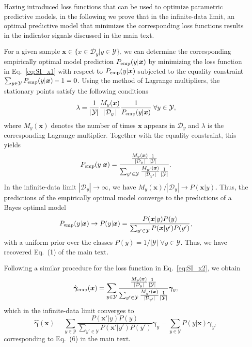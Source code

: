Having introduced loss functions that can be used to optimize parametric predictive models, in the following we prove that in the infinite-data limit, an optimal predictive model that minimizes the corresponding loss functions results in the indicator signals discussed in the main text.

\indent For a given sample $\bm{x} \in \{x \in \mathcal{D}_{y}|y \in \mathcal{Y} \}$, we can determine the corresponding empirically optimal model prediction $P_{\rm emp}(y|\bm{x})$ by minimizing the loss function in Eq.~\eqref{eq:SI_x1} with respect to $P_{\rm emp}(y|\bm{x})$ subjected to the equality constraint $\sum_{y\in\mathcal{Y}} P_{\rm emp}(y|\bm{x}) - 1 = 0$. Using the method of Lagrange multipliers, the stationary points satisfy the following conditions
\begin{equation}
    \lambda = \frac{1}{|\mathcal{Y}|} \frac{M_{y}(\bm{x})}{|\mathcal{D}_{y}|} \frac{1}{P_{\rm emp}(y|\bm{x})}\; \forall y \in \mathcal{Y},
\end{equation}
where $M_{y}(\bm{x})$ denotes the number of times $\bm{x}$ appears in $\mathcal{D}_{y}$ and $\lambda$ is the corresponding Lagrange multiplier. Together with the equality constraint, this yields
\begin{equation}
    P_{\rm emp}(y|\bm{x}) = \frac{\frac{M_{y}(\bm{x})}{|\mathcal{D}_{y}|} \frac{1}{|\mathcal{Y}|}}{\sum_{y' \in \mathcal{Y}} \frac{M_{y'}(\bm{x})}{|\mathcal{D}_{y'}|} \frac{1}{|\mathcal{Y}|}}.
\end{equation}
In the infinite-data limit $|\mathcal{D}_{y}| \rightarrow \infty$, 
 we have $M_{y}(\bm{x})/|\mathcal{D}_{y}| \rightarrow P(\bm{x}|y)$. Thus, the predictions of the empirically optimal model converge to the predictions of a Bayes optimal model
\begin{equation}\label{eq:SI_optt}
    P_{\rm emp}(y|\bm{x}) \rightarrow P(y|\bm{x}) = \frac{P(\bm{x}|y)P(y)}{\sum_{y' \in \mathcal{Y}} P(\bm{x}|y')P(y')},
\end{equation}
with a uniform prior over the classes $P(y) = 1/|\mathcal{Y}|\; \forall y \in \mathcal{Y}$. Thus, we have recovered Eq.~(1) of the main text.

\indent Following a similar procedure for the loss function in Eq.~\eqref{eq:SI_x2}, we obtain
\begin{equation}
    \hat{\bm{\gamma}}_{\rm emp}(\bm{x}) = \sum_{y \in \mathcal{Y}} \frac{ \frac{M_{y}(\bm{x})}{|\mathcal{D}_{y}|} \frac{1}{|\mathcal{Y}|}}{\sum_{y' \in \mathcal{Y}} \frac{M_{y'}(\bm{x})}{|\mathcal{D}_{y'}|} \frac{1}{|\mathcal{Y}|}} \bm{\gamma}_{y},
\end{equation}
which in the infinite-data limit converges to 
\begin{equation}
    \hat{\bm{\gamma}}(\bm{x}) = \sum_{y\in \mathcal{Y}} \frac{P(\bm{x}'|y)P(y)}{\sum_{y'\in \mathcal{Y}} P(\bm{x}'|y')P(y')} \bm{\gamma}_{y} = \sum_{y\in \mathcal{Y}} P(y|\bm{x}) \bm{\gamma}_{y},
\end{equation}
corresponding to Eq.~(6) in the main text.

